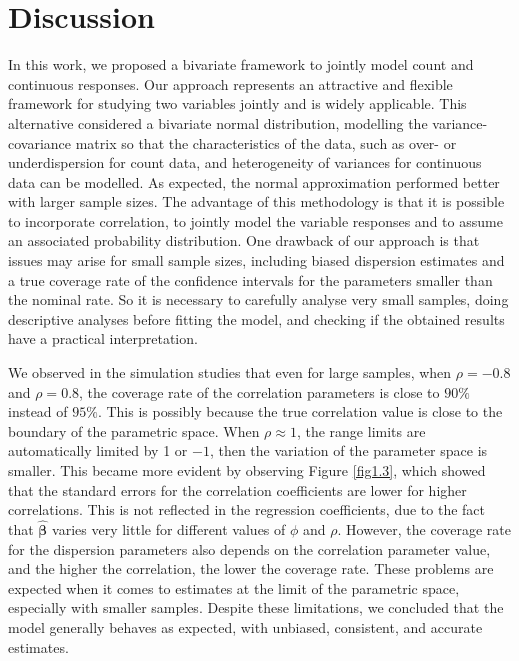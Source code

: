 \documentclass[useAMS,referee]{biom}
\begin{document}
\section{Discussion}
\label{s:discuss}

In this work, we proposed a bivariate framework to jointly model count and continuous responses. Our approach represents an attractive and flexible framework for studying two variables jointly and is widely applicable. This alternative considered a bivariate normal distribution, modelling the variance-covariance matrix so that the characteristics of the data, such as over- or underdispersion for count data, and heterogeneity of variances for continuous data can be modelled. As expected, the normal approximation performed better with larger sample sizes. The advantage of this methodology is that it is possible to incorporate correlation, to jointly model the variable responses and to assume an associated probability distribution. One drawback of our approach is that issues may arise for small sample sizes, including biased dispersion estimates and a true coverage rate of the confidence intervals for the parameters smaller than the nominal rate. So it is necessary to carefully analyse very small samples, doing descriptive analyses before fitting the model, and checking if the obtained results have a practical interpretation.

We observed in the simulation studies that even for large samples, when $\rho = -0.8$ and $\rho = 0.8$,  the coverage rate of the correlation parameters is close to $90\%$ instead of $95\%$. This is possibly because the true correlation value is close to the boundary of the parametric space. When  $\rho \approx 1$,  the range limits are automatically limited by 1 or $-1$, then the variation of the parameter space is smaller. This became more evident by observing Figure \ref{fig1.3}, which showed that the standard errors for the correlation coefficients are lower for higher correlations. This is not reflected in the regression coefficients, due to the fact that $\boldsymbol{\hat\beta}$ varies very little for different values of $\phi$ and $\rho$. However, the coverage rate for the dispersion parameters also depends on the correlation parameter value, and the higher the correlation, the lower the coverage rate.  These problems are expected when it comes to estimates at the limit of the parametric space, especially with smaller samples. Despite these limitations, we concluded that the model generally behaves as expected, with unbiased, consistent, and accurate estimates.
\end{document}
